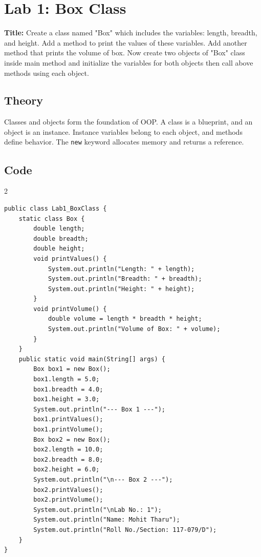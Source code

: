 \documentclass[10pt,a4paper]{article}
\begin{document}
\section*{Lab 1: Box Class}

\textbf{Title:} Create a class named "Box" which includes the variables: length, breadth, and height. Add a method to print the values of these variables. Add another method that prints the volume of box. Now create two objects of "Box" class inside main method and initialize the variables for both objects then call above methods using each object.

\subsection*{Theory}
Classes and objects form the foundation of OOP. A class is a blueprint, and an object is an instance. Instance variables belong to each object, and methods define behavior. The \texttt{new} keyword allocates memory and returns a reference.

\subsection*{Code}
\begin{multicols}{2}
\begin{lstlisting}
public class Lab1_BoxClass {
    static class Box {
        double length;
        double breadth;
        double height;
        void printValues() {
            System.out.println("Length: " + length);
            System.out.println("Breadth: " + breadth);
            System.out.println("Height: " + height);
        }
        void printVolume() {
            double volume = length * breadth * height;
            System.out.println("Volume of Box: " + volume);
        }
    }
    public static void main(String[] args) {
        Box box1 = new Box();
        box1.length = 5.0;
        box1.breadth = 4.0;
        box1.height = 3.0;
        System.out.println("--- Box 1 ---");
        box1.printValues();
        box1.printVolume();
        Box box2 = new Box();
        box2.length = 10.0;
        box2.breadth = 8.0;
        box2.height = 6.0;
        System.out.println("\n--- Box 2 ---");
        box2.printValues();
        box2.printVolume();
        System.out.println("\nLab No.: 1");
        System.out.println("Name: Mohit Tharu");
        System.out.println("Roll No./Section: 117-079/D");
    }
}
\end{lstlisting}
\end{multicols}
\end{document}
